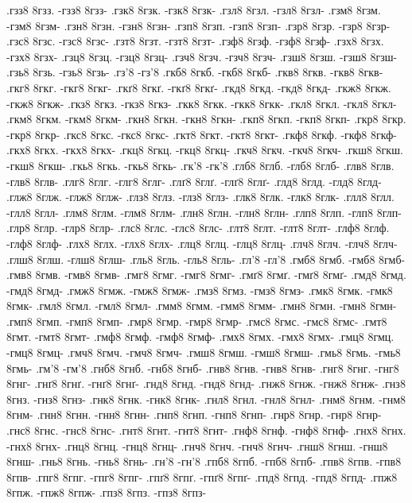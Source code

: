 {.гзз8 8гзз. -гзз8 8гзз-
.гзк8 8гзк. -гзк8 8гзк-
.гзл8 8гзл. -гзл8 8гзл-
.гзм8 8гзм. -гзм8 8гзм-
.гзн8 8гзн. -гзн8 8гзн-
.гзп8 8гзп. -гзп8 8гзп-
.гзр8 8гзр. -гзр8 8гзр-
.гзс8 8гзс. -гзс8 8гзс-
.гзт8 8гзт. -гзт8 8гзт-
.гзф8 8гзф. -гзф8 8гзф-
.гзх8 8гзх. -гзх8 8гзх-
.гзц8 8гзц. -гзц8 8гзц-
.гзч8 8гзч. -гзч8 8гзч-
.гзш8 8гзш. -гзш8 8гзш-
.гзь8 8гзь. -гзь8 8гзь-
.гз'8 -гз'8
.гкб8 8гкб. -гкб8 8гкб-
.гкв8 8гкв. -гкв8 8гкв-
.гкг8 8гкг. -гкг8 8гкг-
.гкґ8 8гкґ. -гкґ8 8гкґ-
.гкд8 8гкд. -гкд8 8гкд-
.гкж8 8гкж. -гкж8 8гкж-
.гкз8 8гкз. -гкз8 8гкз-
.гкк8 8гкк. -гкк8 8гкк-
.гкл8 8гкл. -гкл8 8гкл-
.гкм8 8гкм. -гкм8 8гкм-
.гкн8 8гкн. -гкн8 8гкн-
.гкп8 8гкп. -гкп8 8гкп-
.гкр8 8гкр. -гкр8 8гкр-
.гкс8 8гкс. -гкс8 8гкс-
.гкт8 8гкт. -гкт8 8гкт-
.гкф8 8гкф. -гкф8 8гкф-
.гкх8 8гкх. -гкх8 8гкх-
.гкц8 8гкц. -гкц8 8гкц-
.гкч8 8гкч. -гкч8 8гкч-
.гкш8 8гкш. -гкш8 8гкш-
.гкь8 8гкь. -гкь8 8гкь-
.гк'8 -гк'8
.глб8 8глб. -глб8 8глб-
.глв8 8глв. -глв8 8глв-
.глг8 8глг. -глг8 8глг-
.глґ8 8глґ. -глґ8 8глґ-
.глд8 8глд. -глд8 8глд-
.глж8 8глж. -глж8 8глж-
.глз8 8глз. -глз8 8глз-
.глк8 8глк. -глк8 8глк-
.глл8 8глл. -глл8 8глл-
.глм8 8глм. -глм8 8глм-
.глн8 8глн. -глн8 8глн-
.глп8 8глп. -глп8 8глп-
.глр8 8глр. -глр8 8глр-
.глс8 8глс. -глс8 8глс-
.глт8 8глт. -глт8 8глт-
.глф8 8глф. -глф8 8глф-
.глх8 8глх. -глх8 8глх-
.глц8 8глц. -глц8 8глц-
.глч8 8глч. -глч8 8глч-
.глш8 8глш. -глш8 8глш-
.гль8 8гль. -гль8 8гль-
.гл'8 -гл'8
.гмб8 8гмб. -гмб8 8гмб-
.гмв8 8гмв. -гмв8 8гмв-
.гмг8 8гмг. -гмг8 8гмг-
.гмґ8 8гмґ. -гмґ8 8гмґ-
.гмд8 8гмд. -гмд8 8гмд-
.гмж8 8гмж. -гмж8 8гмж-
.гмз8 8гмз. -гмз8 8гмз-
.гмк8 8гмк. -гмк8 8гмк-
.гмл8 8гмл. -гмл8 8гмл-
.гмм8 8гмм. -гмм8 8гмм-
.гмн8 8гмн. -гмн8 8гмн-
.гмп8 8гмп. -гмп8 8гмп-
.гмр8 8гмр. -гмр8 8гмр-
.гмс8 8гмс. -гмс8 8гмс-
.гмт8 8гмт. -гмт8 8гмт-
.гмф8 8гмф. -гмф8 8гмф-
.гмх8 8гмх. -гмх8 8гмх-
.гмц8 8гмц. -гмц8 8гмц-
.гмч8 8гмч. -гмч8 8гмч-
.гмш8 8гмш. -гмш8 8гмш-
.гмь8 8гмь. -гмь8 8гмь-
.гм'8 -гм'8
.гнб8 8гнб. -гнб8 8гнб-
.гнв8 8гнв. -гнв8 8гнв-
.гнг8 8гнг. -гнг8 8гнг-
.гнґ8 8гнґ. -гнґ8 8гнґ-
.гнд8 8гнд. -гнд8 8гнд-
.гнж8 8гнж. -гнж8 8гнж-
.гнз8 8гнз. -гнз8 8гнз-
.гнк8 8гнк. -гнк8 8гнк-
.гнл8 8гнл. -гнл8 8гнл-
.гнм8 8гнм. -гнм8 8гнм-
.гнн8 8гнн. -гнн8 8гнн-
.гнп8 8гнп. -гнп8 8гнп-
.гнр8 8гнр. -гнр8 8гнр-
.гнс8 8гнс. -гнс8 8гнс-
.гнт8 8гнт. -гнт8 8гнт-
.гнф8 8гнф. -гнф8 8гнф-
.гнх8 8гнх. -гнх8 8гнх-
.гнц8 8гнц. -гнц8 8гнц-
.гнч8 8гнч. -гнч8 8гнч-
.гнш8 8гнш. -гнш8 8гнш-
.гнь8 8гнь. -гнь8 8гнь-
.гн'8 -гн'8
.гпб8 8гпб. -гпб8 8гпб-
.гпв8 8гпв. -гпв8 8гпв-
.гпг8 8гпг. -гпг8 8гпг-
.гпґ8 8гпґ. -гпґ8 8гпґ-
.гпд8 8гпд. -гпд8 8гпд-
.гпж8 8гпж. -гпж8 8гпж-
.гпз8 8гпз. -гпз8 8гпз-
}
